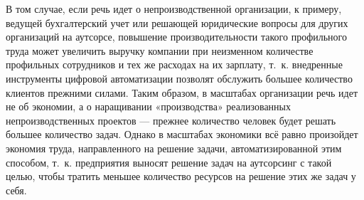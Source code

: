 \documentclass{article}
\begin{document}
В том случае, если речь идет о непроизводственной организации, к примеру, ведущей бухгалтерский учет или решающей юридические вопросы для других организаций на аутсорсе, повышение производительности такого профильного труда может увеличить выручку компании при неизменном количестве профильных сотрудников и тех же расходах на их зарплату, т. к. внедренные инструменты цифровой автоматизации позволят обслужить большее количество клиентов прежними силами. Таким образом, в масштабах организации речь идет не об экономии, а о наращивании «производства» реализованных непроизводственных проектов — прежнее количество человек будет решать большее количество задач. Однако в масштабах экономики всё равно произойдет экономия труда, направленного на решение задачи, автоматизированной этим способом, т. к. предприятия выносят решение задач на аутсорсинг с такой целью, чтобы тратить меньшее количество ресурсов на решение этих же задач у себя.
\end{document}
